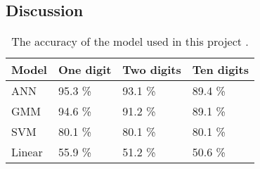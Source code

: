 \subsection*{Discussion}


\begin{table}[h]
\begin{tabular}{@{}l|lll@{}}
\toprule
Model 		   		   & One digit            & Two digits  & Ten digits   \\ \midrule
ANN                    & 95.3 \%                & 93.1 \% & 89.4 \% \\
GMM                    & 94.6 \%                & 91.2 \% & 89.1 \% \\
SVM                    & 80.1 \%                & 80.1 \% & 80.1 \% \\ 
Linear                 & 55.9 \% 				& 51.2 \% & 50.6 \%
\end{tabular}
\caption{The accuracy of the model used in this project .}
\label{table:result}
\end{table}
